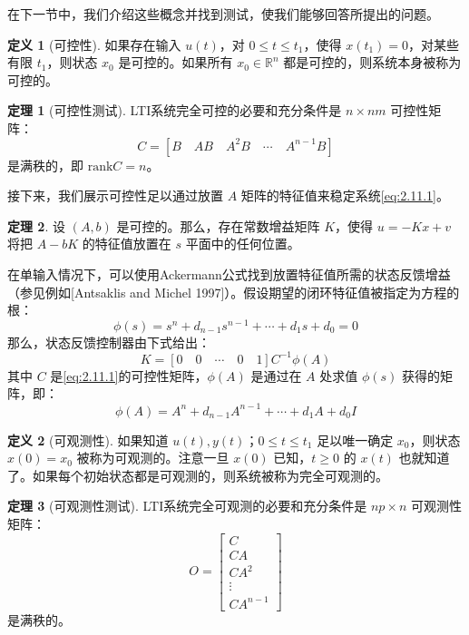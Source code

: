 \documentclass[UTF8,12pt,a4paper]{ctexart}
\theoremstyle{definition}
\newtheorem{definition}{定义}[section]
\newtheorem{theorem}{定理}[section]
\begin{document}
在下一节中，我们介绍这些概念并找到测试，使我们能够回答所提出的问题。

\begin{definition}[可控性]
如果存在输入 $u(t)$，对 $0 \leq t \leq t_1$，使得 $x(t_1)=0$，对某些有限 $t_1$，则状态 $x_0$ 是可控的。如果所有 $x_0 \in \mathbb{R}^n$ 都是可控的，则系统本身被称为可控的。
\end{definition}

\begin{theorem}[可控性测试]
LTI系统完全可控的必要和充分条件是 $n \times nm$ 可控性矩阵：
\begin{equation}\label{eq:2.11.2}
C = [B \quad AB \quad A^2B \quad \cdots \quad A^{n-1}B]
\end{equation}
是满秩的，即 $\text{rank} C = n$。
\end{theorem}

接下来，我们展示可控性足以通过放置 $A$ 矩阵的特征值来稳定系统\eqref{eq:2.11.1}。

\begin{theorem}
设 $(A, b)$ 是可控的。那么，存在常数增益矩阵 $K$，使得 $u=-Kx+v$ 将把 $A-bK$ 的特征值放置在 $s$ 平面中的任何位置。
\end{theorem}

在单输入情况下，可以使用Ackermann公式找到放置特征值所需的状态反馈增益（参见例如[Antsaklis and Michel 1997]）。假设期望的闭环特征值被指定为方程的根：
\begin{equation}\label{eq:2.11.3}
\phi(s) = s^n + d_{n-1}s^{n-1} + \cdots + d_1 s + d_0 = 0
\end{equation}
那么，状态反馈控制器由下式给出：
\begin{equation}\label{eq:2.11.4}
K = [0 \quad 0 \quad \cdots \quad 0 \quad 1]C^{-1}\phi(A)
\end{equation}
其中 $C$ 是\eqref{eq:2.11.1}的可控性矩阵，$\phi(A)$ 是通过在 $A$ 处求值 $\phi(s)$ 获得的矩阵，即：
\begin{equation}\label{eq:2.11.5}
\phi(A) = A^n + d_{n-1}A^{n-1} + \cdots + d_1 A + d_0 I
\end{equation}

\begin{definition}[可观测性]
如果知道 $u(t), y(t)$；$0 \leq t \leq t_1$ 足以唯一确定 $x_0$，则状态 $x(0)=x_0$ 被称为可观测的。注意一旦 $x(0)$ 已知，$t \geq 0$ 的 $x(t)$ 也就知道了。如果每个初始状态都是可观测的，则系统被称为完全可观测的。
\end{definition}

\begin{theorem}[可观测性测试]
LTI系统完全可观测的必要和充分条件是 $np \times n$ 可观测性矩阵：
\begin{equation}\label{eq:2.11.6}
O = \begin{bmatrix} C \\ CA \\ CA^2 \\ \vdots \\ CA^{n-1} \end{bmatrix}
\end{equation}
是满秩的。
\end{theorem}
\end{document}
